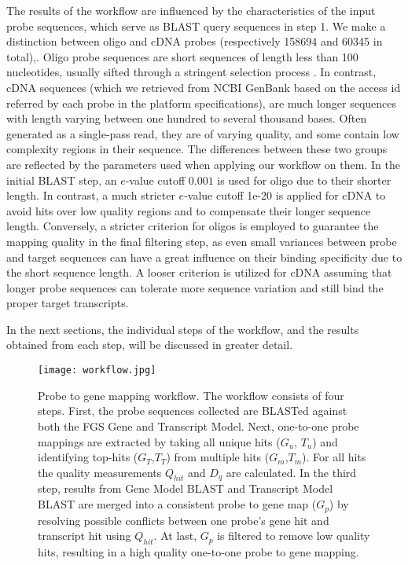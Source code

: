 The results of the workflow are influenced by the characteristics
of the input probe sequences, which serve as BLAST query
sequences in step 1. We make a distinction between oligo and cDNA
probes (respectively 158694 and 60345 in total),. Oligo probe sequences
are short sequences of length less than 100 nucleotides, usually
sifted through a stringent selection process \cite{Leparc2009,Rouillard2003}. 
In contrast, cDNA sequences (which
we retrieved from NCBI GenBank based on the access id referred by
each probe in the platform specifications), are much longer
sequences with length varying between one hundred to several
thousand bases. Often generated as a single-pass read, they are
of varying quality, and some contain low complexity regions in
their sequence. The differences between these two groups are
reflected by the parameters used when applying our workflow on
them. In the initial BLAST step, an $e$-value cutoff $0.001$ is used
for oligo due to their shorter length. In contrast, a much
stricter $e$-value cutoff 1e-20 is applied for cDNA to avoid hits
over low quality regions and to compensate their longer sequence
length. Conversely, a stricter criterion for oligos is employed
to guarantee the mapping quality in the final filtering step, as
even small variances between probe and target sequences can have
a great influence on their binding specificity due to the short
sequence length. A looser criterion is utilized for cDNA assuming
that longer probe sequences can tolerate more sequence variation
and still bind the proper target transcripts.

In the next sections, the individual steps of the workflow, and
the results obtained from each step, will be discussed in greater
detail.

\begin{figure}
	\centering
	\medskip
  	\texttt{[image: workflow.jpg]}
  	\caption[Probe to gene mapping workflow]
  	{Probe to gene mapping workflow. The workflow consists of four
  	steps. First, the probe sequences collected are BLASTed against
  	both the FGS Gene and Transcript Model. Next, one-to-one probe
  	mappings are extracted by taking all unique hits ($G_u$, $T_u$) and
  	identifying top-hits ($G_T$,$T_T$) from multiple hits ($G_m$,$T_m$). For all
  	hits the quality measurements $Q_{hit}$ and $D_q$ are calculated. In the
  	third step, results from Gene Model BLAST and Transcript Model
  	BLAST are merged into a consistent probe to gene map ($G_p$) by
  	resolving possible conflicts between one probe’s gene hit and
  	transcript hit using $Q_{hit}$. At last, $G_p$ is filtered to remove low
  	quality hits, resulting in a high quality one-to-one probe to
  	gene mapping.}
  	\label{fig:magic-pmap}
\end{figure}


